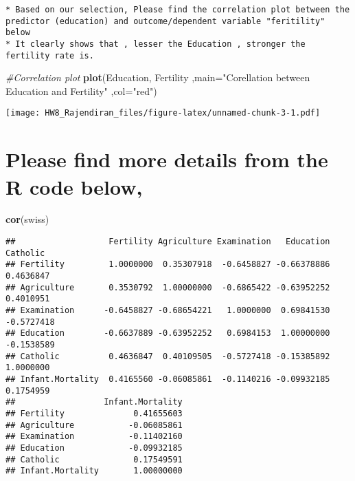\documentclass[]{article}
\newenvironment{Shaded}{\begin{snugshade}}{\end{snugshade}}
\newcommand{\CommentTok}[1]{\textcolor[rgb]{0.56,0.35,0.01}{\textit{#1}}}
\newcommand{\DataTypeTok}[1]{\textcolor[rgb]{0.13,0.29,0.53}{#1}}
\newcommand{\KeywordTok}[1]{\textcolor[rgb]{0.13,0.29,0.53}{\textbf{#1}}}
\newcommand{\NormalTok}[1]{#1}
\newcommand{\StringTok}[1]{\textcolor[rgb]{0.31,0.60,0.02}{#1}}
\begin{document}
\begin{verbatim}
* Based on our selection, Please find the correlation plot between the predictor (education) and outcome/dependent variable "feritility" below
* It clearly shows that , lesser the Education , stronger the fertility rate is.
\end{verbatim}

\begin{Shaded}
\begin{Highlighting}[]
\CommentTok{#Correlation plot}
\KeywordTok{plot}\NormalTok{(Education, Fertility}
\NormalTok{     ,}\DataTypeTok{main=}\StringTok{"Corellation between Education and Fertility"}
\NormalTok{     ,}\DataTypeTok{col=}\StringTok{"red"}\NormalTok{)}
\end{Highlighting}
\end{Shaded}

\texttt{[image: HW8\_Rajendiran\_files/figure-latex/unnamed-chunk-3-1.pdf]}

\hypertarget{please-find-more-details-from-the-r-code-below}{%
\section{Please find more details from the R code
below,}\label{please-find-more-details-from-the-r-code-below}}

\begin{Shaded}
\begin{Highlighting}[]
\KeywordTok{cor}\NormalTok{(swiss)}
\end{Highlighting}
\end{Shaded}

\begin{verbatim}
##                   Fertility Agriculture Examination   Education   Catholic
## Fertility         1.0000000  0.35307918  -0.6458827 -0.66378886  0.4636847
## Agriculture       0.3530792  1.00000000  -0.6865422 -0.63952252  0.4010951
## Examination      -0.6458827 -0.68654221   1.0000000  0.69841530 -0.5727418
## Education        -0.6637889 -0.63952252   0.6984153  1.00000000 -0.1538589
## Catholic          0.4636847  0.40109505  -0.5727418 -0.15385892  1.0000000
## Infant.Mortality  0.4165560 -0.06085861  -0.1140216 -0.09932185  0.1754959
##                  Infant.Mortality
## Fertility              0.41655603
## Agriculture           -0.06085861
## Examination           -0.11402160
## Education             -0.09932185
## Catholic               0.17549591
## Infant.Mortality       1.00000000
\end{verbatim}
\end{document}
